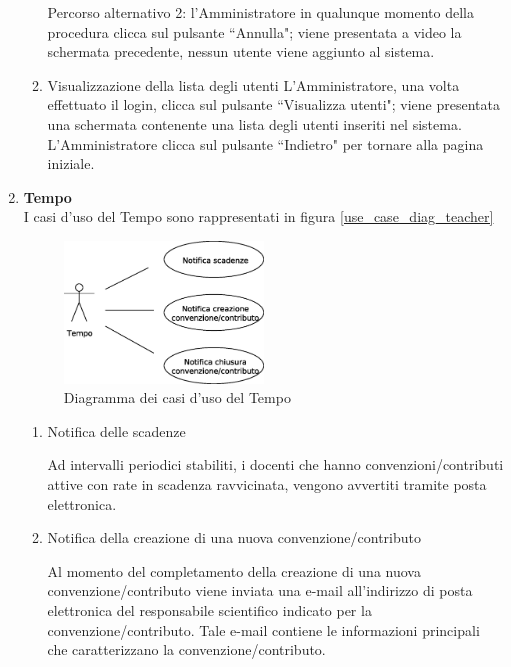 \begin{enumerate}
\begin{enumerate}
 Percorso alternativo 2:
 l'Amministratore in qualunque momento della procedura clicca sul pulsante ``Annulla"; viene presentata a video la schermata precedente,
 nessun utente viene aggiunto al sistema.
 
 \item Visualizzazione della lista degli utenti \label{UC_view_user_list}
  L'Amministratore, una volta effettuato il login, clicca sul pulsante ``Visualizza utenti"; viene presentata una schermata contenente una lista  degli
  utenti inseriti nel sistema. L'Amministratore clicca sul pulsante ``Indietro" per tornare alla pagina iniziale.
\end{enumerate}

\item \textbf{Tempo}\\
I casi d'uso del Tempo sono rappresentati in figura \ref{use_case_diag_teacher}
\begin{figure}[h]
  \caption{Diagramma dei casi d'uso del Tempo}
  \label{use_case_diag_time}
  \centering
\includegraphics[width = 0.5\textwidth]{images/casi_uso_tempo.eps}
\end{figure}
\begin{enumerate}
 \item Notifica delle scadenze\\ \label{UC_notify_deadlines}
 
    Ad intervalli periodici stabiliti, i docenti che hanno convenzioni/contributi attive con rate in scadenza ravvicinata, vengono avvertiti tramite posta elettronica.
  
 
 \item Notifica della creazione di una nuova convenzione/contributo\\ \label{UC_notify_new_contract}
 
    Al momento del completamento della creazione di una nuova convenzione/contributo viene inviata una e-mail all'indirizzo di posta elettronica del responsabile scientifico indicato per la convenzione/contributo. Tale e-mail contiene
    le informazioni principali che caratterizzano la convenzione/contributo.
  

\end{enumerate}
\end{enumerate}
